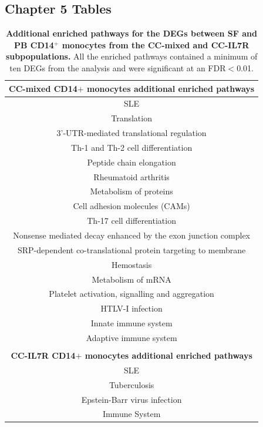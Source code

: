 \subsection{Chapter 5 Tables}

\begin{table}[htbp]
\centering
\begin{tabular}{@{} c }
\toprule
\textbf{CC-mixed CD14$+$ monocytes additional enriched pathways} \\
\midrule
\midrule
SLE \\
Translation \\
3'-UTR-mediated translational regulation \\
Th-1 and Th-2 cell differentiation \\
Peptide chain elongation \\
Rheumatoid arthritis \\
Metabolism of proteins \\
Cell adhesion molecules (CAMs) \\
Th-17 cell differentiation \\
Nonsense mediated decay enhanced by the exon junction complex \\
SRP-dependent co-translational protein targeting to membrane \\
Hemostasis \\
Metabolism of mRNA \\
Platelet activation, signalling and aggregation \\
HTLV-I infection \\
Innate immune system \\
Adaptive immune system \\
                        \\
\textbf{CC-IL7R CD14$+$ monocytes additional enriched pathways} \\
\midrule
\midrule
SLE \\
Tuberculosis \\
Epstein-Barr virus infection \\
Immune System \\
\bottomrule
\end{tabular}
\medskip %
\caption[Additional enriched pathways for the DEGs between SF and PB CD14$^+$ monocytes from the CC-mixed and CC-IL7R subpopulations.]{\textbf{Additional enriched pathways for the DEGs between SF and PB CD14$^+$ monocytes from the CC-mixed and CC-IL7R subpopulations.} All the enriched pathways contained a minimum of ten DEGs from the analysis and were significant at an FDR$<$0.01.}
\label{tab:PSA_scRNAseq_CC_mixed_and_IL7R_additional_pathways}
\end{table}




